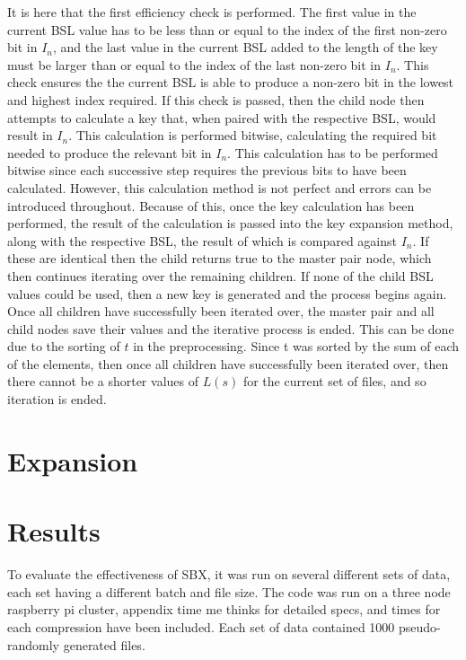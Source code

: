 \documentclass{hehe}
\begin{document}
It is here that the first efficiency check is performed. The first value in the current BSL value has to be less than or equal to the index of the first non-zero bit in $I_n$, and the last value in the current BSL added to the length of the key must be larger than or equal to the index of the last non-zero bit in $I_n$. This check ensures the the current BSL is able to produce a non-zero bit in the lowest and highest index required. If this check is passed, then the child node then attempts to calculate a key that, when paired with the respective BSL, would result in $I_n$. This calculation is performed bitwise, calculating the required bit needed to produce the relevant bit in $I_n$. This calculation has to be performed bitwise since each successive step requires the previous bits to have been calculated. However, this calculation method is not perfect and errors can be introduced throughout. Because of this, once the key calculation has been performed, the result of the calculation is passed into the key expansion method, along with the respective BSL, the result of which is compared against $I_n$. If these are identical then the child returns true to the master pair node, which then continues iterating over the remaining children. If none of the child BSL values could be used, then a new key is generated and the process begins again. Once all children have successfully been iterated over, the master pair and all child nodes save their values and the iterative process is ended. This can be done due to the sorting of $t$ in the preprocessing. Since t was sorted by the sum of each of the elements, then once all children have successfully been iterated over, then there cannot be a shorter values of $L(s)$ for the current set of files, and so iteration is ended.

\section{Expansion}

\section{Results}

To evaluate the effectiveness of SBX, it was run on several different sets of data, each set having a different batch and file size. The code was run on a three node raspberry pi cluster, appendix time me thinks for detailed specs, and times for each compression have been included. Each set of data contained 1000 pseudo-randomly generated files.
\end{document}
